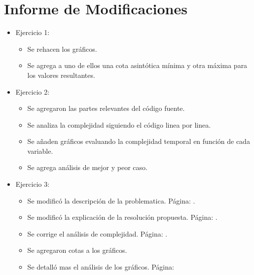\section{Informe de Modificaciones}

\begin{itemize}

	\item Ejercicio 1:
	\begin{itemize}
		\item Se rehacen los gráficos.
		\item Se agrega a uno de ellos una cota asintótica mínima y otra máxima para los valores resultantes.
	\end{itemize}
	
	\item Ejercicio 2:
	\begin{itemize}
		\item Se agregaron las partes relevantes del código fuente.
		\item Se analiza la complejidad siguiendo el código linea por linea.
		\item Se a\~naden gráficos evaluando la complejidad temporal en función de cada variable.
		\item Se agrega análisis de mejor y peor caso.
	\end{itemize}
	
	\item Ejercicio 3:
	\begin{itemize}
		\item Se modificó la descripción de la problematica. Página: \pageref{descTres}.
		\item Se modificó la explicación de la resolución propuesta. Página: \pageref{agm}.
		\item Se corrige el análisis de complejidad. Página: \pageref{union}.
		\item Se agregaron cotas a los gráficos.
		\item Se detalló mas el análisis de los gráficos. Página: \pageref{gfTres}
	\end{itemize}
\end{itemize}